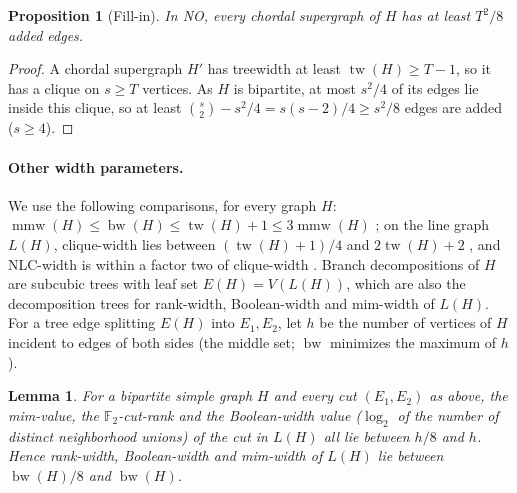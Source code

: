 \documentclass[11pt,letterpaper]{article}
\newtheorem{lemma}[theorem]{Lemma}
\newtheorem{proposition}[theorem]{Proposition}
\theoremstyle{definition}
\theoremstyle{remark}
\newcommand{\F}{\mathbb F}
\DeclareMathOperator{\tw}{tw}
\DeclareMathOperator{\bw}{bw}
\DeclareMathOperator{\mmw}{mmw}
\begin{document}
\begin{proposition}[Fill-in]\label{prop:fillin}
In NO, every chordal supergraph of \(H\) has at least \(T^2/8\) added edges.
\end{proposition}

\begin{proof}
A chordal supergraph \(H'\) has treewidth at least \(\tw(H)\ge T-1\), so it
has a clique on \(s\ge T\) vertices. As \(H\) is bipartite, at most
\(s^2/4\) of its edges lie inside this clique, so at least
\(\binom s2-s^2/4=s(s-2)/4\ge s^2/8\) edges are added (\(s\ge4\)).
\end{proof}

\paragraph{Other width parameters.}
We use the following comparisons, for every graph \(H\):
\(\mmw(H)\le\bw(H)\le\tw(H)+1\le3\mmw(H)\) \cite{rs91,vat12,jst15}; on the
line graph \(L(H)\), clique-width lies between \((\tw(H)+1)/4\) and
\(2\tw(H)+2\) \cite{gw07}, and NLC-width is within a factor two of
clique-width \cite{joh98}. Branch decompositions of \(H\) are subcubic trees
with leaf set \(E(H)=V(L(H))\), which are also the decomposition trees for
rank-width, Boolean-width and mim-width of \(L(H)\). For a tree edge
splitting \(E(H)\) into \(E_1,E_2\), let \(h\) be the number of vertices of
\(H\) incident to edges of both sides (the middle set; \(\bw\) minimizes the
maximum of \(h\)).

\begin{lemma}\label{lem:linewidth}
For a bipartite simple graph \(H\) and every cut \((E_1,E_2)\) as above, the
mim-value, the \(\F_2\)-cut-rank and the Boolean-width value
(\(\log_2\) of the number of distinct neighborhood unions) of the cut in
\(L(H)\) all lie between \(h/8\) and \(h\). Hence rank-width, Boolean-width
and mim-width of \(L(H)\) lie between \(\bw(H)/8\) and \(\bw(H)\).
\end{lemma}
\end{document}
